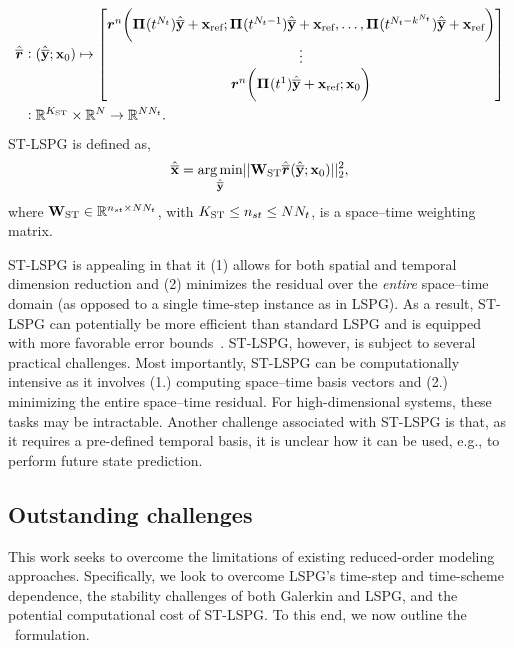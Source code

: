 \documentclass[3p,computermodern,10pt]{elsarticle}
\begin{document}
\begin{align*}
\hat{\overline{\boldsymbol r}}_{\text{}} & \vcentcolon (\hat{\mathbf{\overline{y}}} ;{{\mathbf{x}}_0}) \mapsto \begin{bmatrix}
\boldsymbol r_{}^{n}\bigg( \boldsymbol \Pi^{}(t^{N_t})\hat{\mathbf{\overline{y}}} + \mathbf{x}_\text{ref}; \boldsymbol \Pi^{}(t^{N_t-1})\hat{\mathbf{\overline{y}}} + \mathbf{x}_\text{ref} ,\ldots,  \boldsymbol \Pi^{}(t^{N_t-k^{N_t}})\hat{\mathbf{\overline{y}}} + \mathbf{x}_\text{ref} \bigg) \\ 
\vdots \\
\boldsymbol r_{}^{n}\bigg( \boldsymbol \Pi^{}(t^1)\hat{\mathbf{\overline{y}}} + \mathbf{x}_\text{ref}; {{\mathbf{x}}_0} \bigg) \\ 
\end{bmatrix}  \\
& \vcentcolon \mathbb{R}^{K_{\text{ST}}} \times \mathbb{R}^{N} \rightarrow \mathbb{R}^{N N_t}. 
\end{align*}
ST-LSPG is defined as,
\begin{equation*}
\hat{\mathbf{\overline{x}}} = \underset{ \hat{\mathbf{\overline{y}}} }{\text{arg\,min}}|| \mathbf{W}_{\text{ST}}  \hat{\overline{\boldsymbol r}}_{\text{}}(\hat{\mathbf{\overline{y}}};{{\mathbf{x}}_0}) ||_2^2, 
\end{equation*}
where $\mathbf{W}_{\text{ST}} \in \mathbb{R}^{n_{st} \times N N_t}$, with $K_{\text{ST}} \le n_{st} \le N N_t$, is a space--time weighting matrix.


ST-LSPG is appealing in that it (1) allows for both spatial and temporal dimension reduction and (2) minimizes the residual over the \textit{entire} space--time domain (as opposed to a single time-step instance as in LSPG). As a result, ST-LSPG can potentially be more efficient than standard LSPG and is equipped with more favorable error bounds~\cite{choi_stlspg}. ST-LSPG, however, is subject to several practical challenges.  Most importantly, ST-LSPG can be computationally 
intensive as it involves (1.) computing space--time basis vectors and (2.) minimizing the entire space--time residual. For high-dimensional systems, these tasks may be intractable. Another challenge associated with ST-LSPG is that, as it requires a pre-defined temporal basis, it is unclear how it can be used, e.g., to perform future state prediction.
  
\subsection{Outstanding challenges}
This work seeks to overcome the limitations of existing reduced-order modeling approaches. Specifically, 
we look to overcome LSPG's time-step and time-scheme dependence, the stability challenges of both Galerkin and LSPG, and the potential computational cost of ST-LSPG. To this end, we now outline the \methodNameLower\ formulation. 
%
\end{document}
